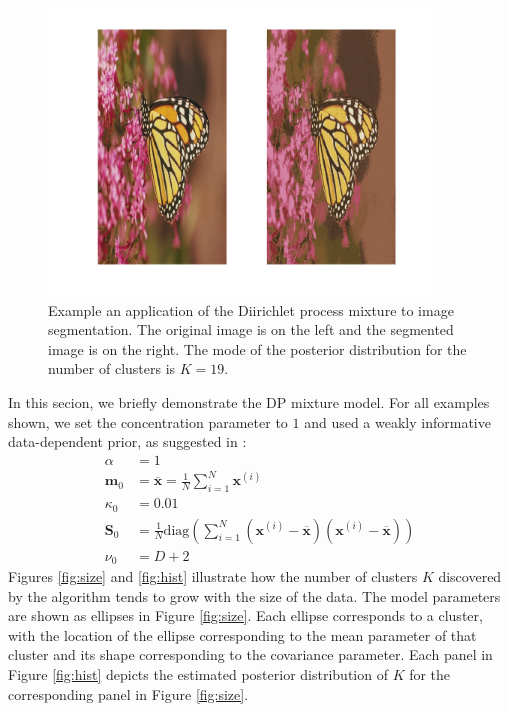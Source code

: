\documentclass[final,3p,times,twocolumn]{elsarticle}
\let\bs\boldsymbol
\let\ol\overline
\begin{document}
\begin{figure}
\includegraphics[width=\textwidth,height=3in]{output.png}
\caption{Example an application of the Diirichlet process mixture to image segmentation. 
The original image is on the left and the segmented image is on the right.
The mode of the posterior distribution for the number of clusters is $K=19$.}
\label{fig:pics}
\end{figure}

In this secion, we briefly demonstrate the DP mixture model.
For all examples shown, we set the concentration parameter to $1$ and used a weakly informative data-dependent prior, as suggested in \cite{Murphy}:
\begin{equation*}
\begin{split}
\alpha &= 1\\
\bs m_0 &= \ol{\bs x} = \frac{1}{N}\sum_{i=1}^N \bs x^{(i)}\\
\kappa_0 &= 0.01\\
\bs S_0 &= \frac{1}{N}\mbox{diag}\left(\sum_{i=1}^N\left(\bs x^{(i)} - \ol{\bs x}\right)\left(\bs x^{(i)} - \ol{\bs x}\right)\right)\\
\nu_0 &= D + 2
\end{split}
\end{equation*}
Figures \ref{fig:size} and \ref{fig:hist} illustrate how the number of clusters $K$ discovered by the algorithm tends to grow with the size of the data.
The model parameters are shown as ellipses in Figure \ref{fig:size}.
Each ellipse corresponds to a cluster, with the location of the ellipse corresponding to the mean parameter of that cluster and its shape corresponding to the covariance parameter.
Each panel in Figure \ref{fig:hist} depicts the estimated posterior distribution of $K$ for the corresponding panel in Figure \ref{fig:size}.
\end{document}
